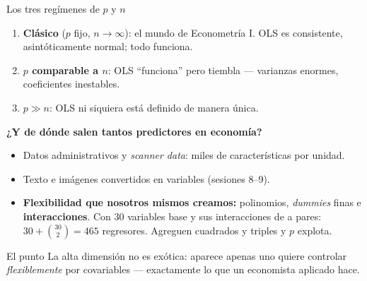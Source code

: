 \documentclass{beamer}
\newcommand{\1}{\mathbb{I}}
\begin{document}
\begin{frame}{Los tres regímenes de $p$ y $n$}
\small
\begin{enumerate}\itemsep6pt
  \item \textbf{Clásico} ($p$ fijo, $n \to \infty$): el mundo de Econometría I. OLS es consistente, asintóticamente normal; todo funciona. \pause
  \item \textbf{$p$ comparable a $n$}: OLS ``funciona'' pero tiembla --- varianzas enormes, coeficientes inestables. \pause
  \item \textbf{$p \gg n$}: OLS ni siquiera está definido de manera única. \pause
\end{enumerate}

\vspace{0.2cm}
\textbf{¿Y de dónde salen tantos predictores en economía?}
\begin{itemize}\itemsep4pt
  \item Datos administrativos y \emph{scanner data}: miles de características por unidad.
  \item Texto e imágenes convertidos en variables (sesiones 8--9).
  \item \textbf{Flexibilidad que nosotros mismos creamos:} polinomios, \emph{dummies} finas e \textbf{interacciones}. Con 30 variables base y sus interacciones de a pares: $30 + \binom{30}{2} = 465$ regresores. Agreguen cuadrados y triples y $p$ explota.
\end{itemize}
\pause

\begin{block}{El punto}
La alta dimensión no es exótica: aparece apenas uno quiere controlar \emph{flexiblemente} por covariables --- exactamente lo que un economista aplicado hace.
\end{block}
\end{frame}
\end{document}
